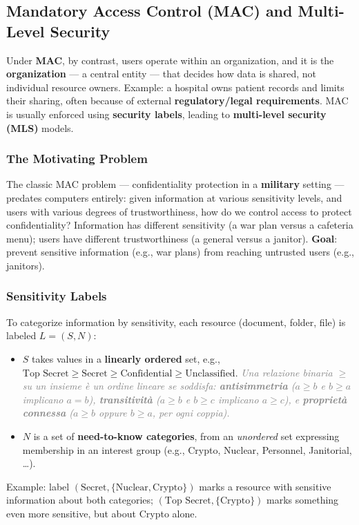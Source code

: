 \documentclass[12pt, a4paper]{article}
\begin{document}
\subsection{Mandatory Access Control (MAC) and Multi-Level Security}
\label{subsec:mls-08}

Under \textbf{MAC}, by contrast, users operate within an organization, and it is the \textbf{organization} --- a central entity --- that decides how data is shared, not individual resource owners. Example: a hospital owns patient records and limits their sharing, often because of external \textbf{regulatory/legal requirements}. MAC is usually enforced using \textbf{security labels}, leading to \textbf{multi-level security (MLS)} models.

\subsubsection{The Motivating Problem}
The classic MAC problem --- confidentiality protection in a \textbf{military} setting --- predates computers entirely: given information at various sensitivity levels, and users with various degrees of trustworthiness, how do we control access to protect confidentiality? Information has different sensitivity (a war plan versus a cafeteria menu); users have different trustworthiness (a general versus a janitor). \textbf{Goal}: prevent sensitive information (e.g., war plans) from reaching untrusted users (e.g., janitors).

\subsubsection{Sensitivity Labels}
To categorize information by sensitivity, each resource (document, folder, file) is labeled $L=(S,N)$:
\begin{itemize}
    \item $S$ takes values in a \textbf{linearly ordered} set, e.g., $\text{Top Secret} \geq \text{Secret} \geq \text{Confidential} \geq \text{Unclassified}$. \textcolor{gray}{\textit{Una relazione binaria $\geq$ su un insieme è un ordine lineare se soddisfa: \textbf{antisimmetria} ($a\geq b$ e $b\geq a$ implicano $a=b$), \textbf{transitività} ($a\geq b$ e $b\geq c$ implicano $a\geq c$), e \textbf{proprietà connessa} ($a\geq b$ oppure $b\geq a$, per ogni coppia).}}
    \item $N$ is a set of \textbf{need-to-know categories}, from an \emph{unordered} set expressing membership in an interest group (e.g., Crypto, Nuclear, Personnel, Janitorial, \dots).
\end{itemize}
Example: label $(\text{Secret}, \{\text{Nuclear}, \text{Crypto}\})$ marks a resource with sensitive information about both categories; $(\text{Top Secret}, \{\text{Crypto}\})$ marks something even more sensitive, but about Crypto alone.
\end{document}
